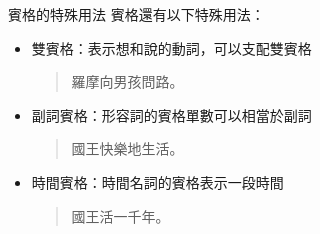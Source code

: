 \documentclass[aspectratio=169]{beamer}
\begin{document}
\begin{frame}{賓格的特殊用法}
    賓格還有以下特殊用法：
    \begin{itemize}
        \item 雙賓格：表示想和說的動詞，可以支配雙賓格\\
        \begin{quotation}
            \rmfamily
             羅摩向男孩問路。
        \end{quotation}
        \item 副詞賓格：形容詞的賓格單數可以相當於副詞\\
        \begin{quotation}
            \rmfamily
             國王快樂地生活。
        \end{quotation}
        \item 時間賓格：時間名詞的賓格表示一段時間\\
        \begin{quotation}
            \rmfamily
             國王活一千年。
        \end{quotation}
    \end{itemize}
\end{frame}
\end{document}
